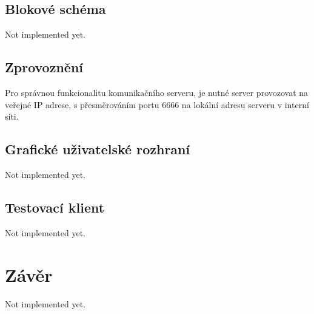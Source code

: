\documentclass[FM,DP]{tulthesis}  %
\begin{document}
\section{Blokové schéma}
Not implemented yet.

\section{Zprovoznění}
Pro správnou funkcionalitu komunikačního serveru, je nutné server provozovat na veřejné IP adrese, s přesměrováním portu 6666 na lokální adresu serveru v interní síti.

\section{Grafické uživatelské rozhraní}
Not implemented yet.

\section{Testovací klient}
Not implemented yet.


\chapter{Závěr}
Not implemented yet.


\end{document}
